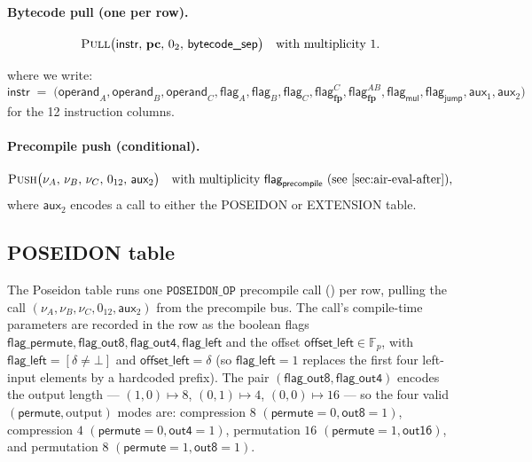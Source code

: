 \documentclass{article}
\theoremstyle{definition}
\newcommand{\Fp}{\mathbb F_p}
\begin{document}
\paragraph{Bytecode pull (one per row).}
\[
\textsc{Pull}\big(\textsf{instr},\, \textbf{pc},\, 0_2,\, \textsf{bytecode\_sep}\big) \quad \text{with multiplicity } 1.
\]

where we write:
\[
\textsf{instr} \;=\; \big(\textsf{operand}_A, \textsf{operand}_B, \textsf{operand}_C, \textsf{flag}_A, \textsf{flag}_B, \textsf{flag}_C, \textsf{flag}^{C}_\textbf{fp}, \textsf{flag}^{AB}_\textbf{fp}, \textsf{flag}_\textsf{mul}, \textsf{flag}_\textsf{jump}, \textsf{aux}_1, \textsf{aux}_2\big)
\]
for the 12 instruction columns.

\paragraph{Precompile push (conditional).}
\[
\textsc{Push}\big(\nu_A,\, \nu_B,\, \nu_C,\, 0_{12},\, \textsf{aux}_2\big) \quad \text{with multiplicity } \textsf{flag}_\textsf{precompile} \text{ (see \Cref{sec:air-eval-after})},
\]
where $\textsf{aux}_2$ encodes a call to either the \textsf{POSEIDON} or \textsf{EXTENSION} table.

\subsection{POSEIDON table}\label{sec:poseidon-table}

The Poseidon table runs one $\texttt{POSEIDON\_OP}$ precompile call () per row, pulling the call $(\nu_A, \nu_B, \nu_C, 0_{12}, \textsf{aux}_2)$ from the precompile bus. The call's compile-time parameters are recorded in the row as the boolean flags $\textsf{flag\_permute}, \textsf{flag\_out8}, \textsf{flag\_out4}, \textsf{flag\_left}$ and the offset $\textsf{offset\_left} \in \Fp$, with $\textsf{flag\_left} = [\delta \neq \bot]$ and $\textsf{offset\_left} = \delta$ (so $\textsf{flag\_left} = 1$ replaces the first four left-input elements by a hardcoded prefix). The pair $(\textsf{flag\_out8}, \textsf{flag\_out4})$ encodes the output length — $(1, 0) \mapsto 8$, $(0, 1) \mapsto 4$, $(0, 0) \mapsto 16$ — so the four valid $(\textsf{permute}, \text{output})$ modes are: compression $8$ $(\textsf{permute}{=}0, \textsf{out8}{=}1)$, compression $4$ $(\textsf{permute}{=}0, \textsf{out4}{=}1)$, permutation $16$ $(\textsf{permute}{=}1, \textsf{out16})$, and permutation $8$ $(\textsf{permute}{=}1, \textsf{out8}{=}1)$.
\end{document}
